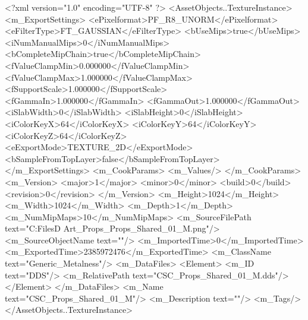 <?xml version="1.0" encoding="UTF-8" ?>
<AssetObjects..TextureInstance>
	<m_ExportSettings>
		<ePixelformat>PF_R8_UNORM</ePixelformat>
		<eFilterType>FT_GAUSSIAN</eFilterType>
		<bUseMips>true</bUseMips>
		<iNumManualMips>0</iNumManualMips>
		<bCompleteMipChain>true</bCompleteMipChain>
		<fValueClampMin>0.000000</fValueClampMin>
		<fValueClampMax>1.000000</fValueClampMax>
		<fSupportScale>1.000000</fSupportScale>
		<fGammaIn>1.000000</fGammaIn>
		<fGammaOut>1.000000</fGammaOut>
		<iSlabWidth>0</iSlabWidth>
		<iSlabHeight>0</iSlabHeight>
		<iColorKeyX>64</iColorKeyX>
		<iColorKeyY>64</iColorKeyY>
		<iColorKeyZ>64</iColorKeyZ>
		<eExportMode>TEXTURE_2D</eExportMode>
		<bSampleFromTopLayer>false</bSampleFromTopLayer>
	</m_ExportSettings>
	<m_CookParams>
		<m_Values/>
	</m_CookParams>
	<m_Version>
		<major>1</major>
		<minor>0</minor>
		<build>0</build>
		<revision>0</revision>
	</m_Version>
	<m_Height>1024</m_Height>
	<m_Width>1024</m_Width>
	<m_Depth>1</m_Depth>
	<m_NumMipMaps>10</m_NumMipMaps>
	<m_SourceFilePath text="C:\Users\Shadow\Desktop\Working Files\3D Art\Textures\CSC_Props\Current\textures\CSC_Props_Shared_01_M.png"/>
	<m_SourceObjectName text=""/>
	<m_ImportedTime>0</m_ImportedTime>
	<m_ExportedTime>2385972476</m_ExportedTime>
	<m_ClassName text="Generic_Metalness"/>
	<m_DataFiles>
		<Element>
			<m_ID text="DDS"/>
			<m_RelativePath text="CSC_Props_Shared_01_M.dds"/>
		</Element>
	</m_DataFiles>
	<m_Name text="CSC_Props_Shared_01_M"/>
	<m_Description text=""/>
	<m_Tags/>
</AssetObjects..TextureInstance>
